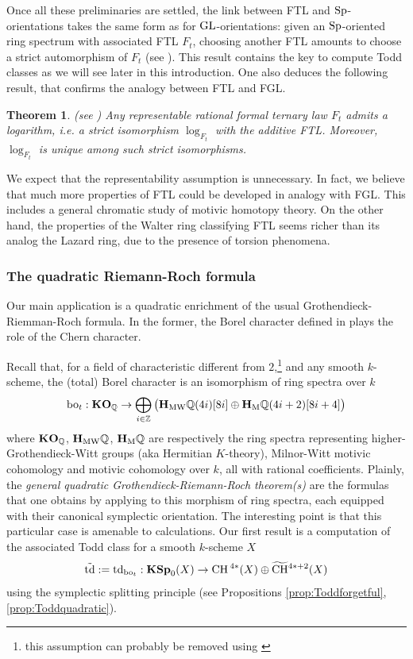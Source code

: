 \documentclass[11pt,leqno]{amsart}
\newtheorem{thmi}{Theorem}
\theoremstyle{remark}
\theoremstyle{definition}
\numberwithin{equation}{thm}
\begin{document}
Once all these preliminaries are settled,
 the link between FTL and $\mathrm{Sp}$-orientations takes the same
 form as for $\mathrm{GL}$-orientations: given an $\mathrm{Sp}$-oriented
 ring spectrum with associated FTL $F_t$, choosing another
 FTL amounts to choose a strict automorphism of $F_t$
 (see ).
 This result contains the key to compute Todd classes
 as we will see later in this introduction.
 One also deduces the following
 result, that confirms the analogy between FTL and FGL.
\begin{thmi}(see ) \label{thmi:log_FTL}
Any representable rational formal ternary law $F_t$ admits a logarithm,
 \emph{i.e.} a strict isomorphism $\log_{F_t}$ with the additive FTL.
 Moreover, $\log_{F_t}$ is unique among such strict isomorphisms.
\end{thmi}
We expect that the representability assumption is unnecessary.
 In fact, we believe that much more properties of FTL could be developed
 in analogy with FGL. This includes a general chromatic study
 of motivic homotopy theory.
 On the other hand, the properties of the Walter ring classifying FTL
 seems richer than its analog the Lazard ring, due to
 the presence of torsion phenomena.
 
\subsubsection*{The quadratic Riemann-Roch formula}

Our main application is a quadratic enrichment
 of the usual Grothendieck-Riemman-Roch formula.
 In the former, the Borel character defined in \cite{DF3} plays the role
 of the Chern character.

Recall that, for a field of characteristic different from $2$,\footnote{this
 assumption can probably be removed using \cite{Calmes24}}
 and any smooth $k$-scheme, the (total) Borel character is an isomorphism 
 of ring spectra over $k$
$$
\operatorname{bo}_t:\mathbf{KO}_{\mathbb{Q}} \rightarrow \bigoplus_{i \in \mathbb{Z}} \big(\mathbf{H}_\mathrm{MW}\mathbb{Q}(4i)[8i] \oplus \mathbf{H}_\mathrm{M}\mathbb{Q}(4i+2)[8i+4]\big)
$$
where $\mathbf{KO}_{\mathbb{Q}}$, $\mathbf{H}_\mathrm{MW}\mathbb{Q}$, $\mathbf{H}_\mathrm{M}\mathbb{Q}$ are respectively the ring spectra representing
 higher-Grothendieck-Witt groups (aka Hermitian $K$-theory), Milnor-Witt motivic cohomology and motivic cohomology over $k$,
 all with rational coefficients. 
 Plainly, the \emph{general quadratic Grothendieck-Riemann-Roch theorem(s)}
 are the formulas that one obtains by applying 
 to this morphism of ring spectra, each equipped with their canonical
 symplectic orientation.
 The interesting point is that this particular case is amenable to calculations.
 Our first result is a computation of the associated Todd class for a smooth $k$-scheme $X$
$$
\tilde {\operatorname{td}}:=\operatorname{td}_{\operatorname{bo}_t}:\mathbf{KSp}_0(X) \rightarrow  \operatorname{CH}{}^{4*}(X)\oplus \widetilde{\operatorname{CH}}{}^{4*+2}(X)
$$
using the symplectic splitting principle (see Propositions \ref{prop:Toddforgetful},
 \ref{prop:Toddquadratic}).
\end{document}
